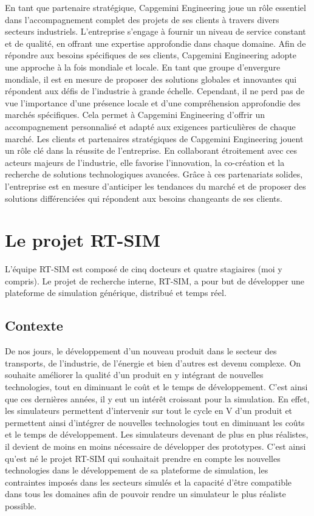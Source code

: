 En tant que partenaire stratégique, Capgemini Engineering joue un rôle essentiel dans l'accompagnement complet des projets de ses clients à travers divers secteurs industriels.
L'entreprise s'engage à fournir un niveau de service constant et de qualité, en offrant une
expertise approfondie dans chaque domaine.
Afin de répondre aux besoins spécifiques de ses clients, Capgemini Engineering adopte une
approche à la fois mondiale et locale. En tant que groupe d'envergure mondiale, il est en mesure
de proposer des solutions globales et innovantes qui répondent aux défis de l'industrie à grande
échelle. Cependant, il ne perd pas de vue l'importance d'une présence locale et d'une
compréhension approfondie des marchés spécifiques. Cela permet à Capgemini Engineering
d'offrir un accompagnement personnalisé et adapté aux exigences particulières de chaque
marché. Les clients et partenaires stratégiques de Capgemini Engineering jouent un rôle clé
dans la réussite de l'entreprise. En collaborant étroitement avec ces acteurs majeurs de
l'industrie, elle favorise l'innovation, la co-création et la recherche de solutions technologiques
avancées. Grâce à ces partenariats solides, l'entreprise est en mesure d'anticiper les tendances
du marché et de proposer des solutions différenciées qui répondent aux besoins changeants de
ses clients.
\section{Le projet RT-SIM}
L’équipe RT-SIM est composé de cinq docteurs et quatre stagiaires
(moi y compris). Le projet de recherche interne, RT-SIM, a pour but de développer
une plateforme de simulation générique, distribué et temps réel.
\subsection{Contexte}
De nos jours, le développement d’un nouveau produit dans le secteur des transports,
de l’industrie, de l’énergie et bien d’autres est devenu complexe. On souhaite
améliorer la qualité d’un produit en y intégrant de nouvelles technologies, tout en
diminuant le coût et le temps de développement.
C’est ainsi que ces dernières années, il y eut un intérêt croissant pour la simulation.
En effet, les simulateurs permettent d’intervenir sur tout le cycle en V d’un produit
et permettent ainsi d’intégrer de nouvelles technologies tout en diminuant les
coûts et le temps de développement. Les simulateurs devenant de plus en plus
réalistes, il devient de moins en moins nécessaire de développer des prototypes.
C’est ainsi qu’est né le projet RT-SIM qui souhaitait prendre en compte les nouvelles
technologies dans le développement de sa plateforme de simulation, les contraintes
imposés dans les secteurs simulés et la capacité d’être compatible dans tous les
domaines afin de pouvoir rendre un simulateur le plus réaliste possible.
